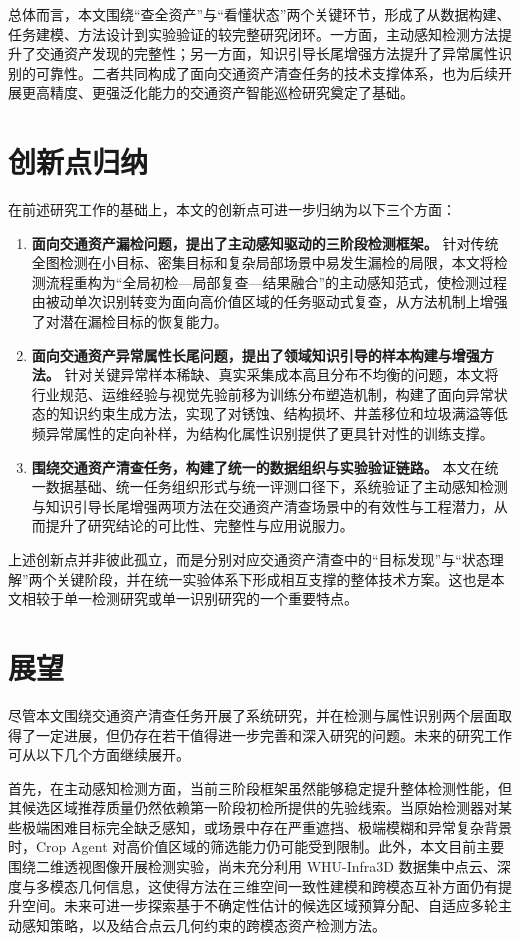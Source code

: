 总体而言，本文围绕“查全资产”与“看懂状态”两个关键环节，形成了从数据构建、任务建模、方法设计到实验验证的较完整研究闭环。一方面，主动感知检测方法提升了交通资产发现的完整性；另一方面，知识引导长尾增强方法提升了异常属性识别的可靠性。二者共同构成了面向交通资产清查任务的技术支撑体系，也为后续开展更高精度、更强泛化能力的交通资产智能巡检研究奠定了基础。

\section{创新点归纳}

在前述研究工作的基础上，本文的创新点可进一步归纳为以下三个方面：

\begin{enumerate}
    \item \textbf{面向交通资产漏检问题，提出了主动感知驱动的三阶段检测框架。} 针对传统全图检测在小目标、密集目标和复杂局部场景中易发生漏检的局限，本文将检测流程重构为“全局初检—局部复查—结果融合”的主动感知范式，使检测过程由被动单次识别转变为面向高价值区域的任务驱动式复查，从方法机制上增强了对潜在漏检目标的恢复能力。
    \item \textbf{面向交通资产异常属性长尾问题，提出了领域知识引导的样本构建与增强方法。} 针对关键异常样本稀缺、真实采集成本高且分布不均衡的问题，本文将行业规范、运维经验与视觉先验前移为训练分布塑造机制，构建了面向异常状态的知识约束生成方法，实现了对锈蚀、结构损坏、井盖移位和垃圾满溢等低频异常属性的定向补样，为结构化属性识别提供了更具针对性的训练支撑。
    \item \textbf{围绕交通资产清查任务，构建了统一的数据组织与实验验证链路。} 本文在统一数据基础、统一任务组织形式与统一评测口径下，系统验证了主动感知检测与知识引导长尾增强两项方法在交通资产清查场景中的有效性与工程潜力，从而提升了研究结论的可比性、完整性与应用说服力。
\end{enumerate}

上述创新点并非彼此孤立，而是分别对应交通资产清查中的“目标发现”与“状态理解”两个关键阶段，并在统一实验体系下形成相互支撑的整体技术方案。这也是本文相较于单一检测研究或单一识别研究的一个重要特点。

\section{展望}

尽管本文围绕交通资产清查任务开展了系统研究，并在检测与属性识别两个层面取得了一定进展，但仍存在若干值得进一步完善和深入研究的问题。未来的研究工作可从以下几个方面继续展开。

首先，在主动感知检测方面，当前三阶段框架虽然能够稳定提升整体检测性能，但其候选区域推荐质量仍然依赖第一阶段初检所提供的先验线索。当原始检测器对某些极端困难目标完全缺乏感知，或场景中存在严重遮挡、极端模糊和异常复杂背景时，Crop Agent 对高价值区域的筛选能力仍可能受到限制。此外，本文目前主要围绕二维透视图像开展检测实验，尚未充分利用 WHU-Infra3D 数据集中点云、深度与多模态几何信息，这使得方法在三维空间一致性建模和跨模态互补方面仍有提升空间。未来可进一步探索基于不确定性估计的候选区域预算分配、自适应多轮主动感知策略，以及结合点云几何约束的跨模态资产检测方法。

